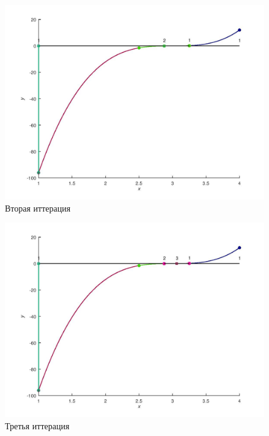 \documentclass[a4paper,12pt]{article}
\begin{document}
    \begin{figure}[H]
        \centering
        \includegraphics[scale=0.4]{2Bolcanoitter.jpg}
        \caption{Вторая иттерация}
    \end{figure}
    \begin{figure}[H]
        \centering
        \includegraphics[scale=0.4]{3Bolcanoitter.jpg}
        \caption{Третья иттерация}
    \end{figure}
\newpage
\end{document}
